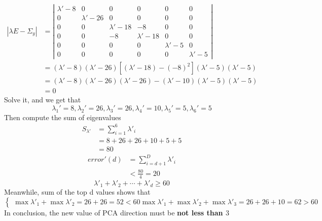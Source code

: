 \documentclass[12pt, letterpaper]{article}
\begin{document}
\begin{equation}
\begin{align}
	|\lambda E-\Sigma_y|
	&= \left|\begin{array}{cccccc}
		\lambda'-8 & 0 & 0 & 0 & 0 & 0\\
		0 & \lambda'-26 & 0 & 0 & 0 & 0\\
		0 & 0 & \lambda'-18 & -8 & 0 & 0\\
		0 & 0 & -8 & \lambda'-18 & 0 & 0\\
		0 & 0 & 0 & 0 & \lambda'-5 & 0\\
		0 & 0 & 0 & 0 & 0 & \lambda'-5
	\end{array}\right|\\
	&= (\lambda'-8)(\lambda'-26)[(\lambda'-18)-(-8)^2](\lambda'-5)(\lambda'-5)\\
	&= (\lambda'-8)(\lambda'-26)(\lambda'-26)-(\lambda'-10)(\lambda'-5)(\lambda'-5)\\
	&= 0
\end{align}
\end{equation}
Solve it, and we get that
\begin{equation}
	\lambda_1'=8,
	\lambda_2'=26,
	\lambda_3'=26,
	\lambda_4'=10,
	\lambda_5'=5,
	\lambda_6'=5
\end{equation}
Then compute the sum of eigenvalues
\begin{equation}
\begin{align}
	S_{\lambda'}
	&= \sum^6_{i=1}\lambda'_i\\
	&= 8+26+26+10+5+5\\
	&= 80
\end{align}
\end{equation}
\begin{equation}
\begin{align}
	error'(d)
	&= \sum^D_{i=d+1}\lambda'_i\\
	&< \frac{80}4=20
\end{align}
\end{equation}
\begin{equation}
	\lambda'_1+\lambda'_2+\cdots+\lambda'_d\geq 60
\end{equation}
Meanwhile, sum of the top d values shows that
\begin{equation}
\begin{cases}
	\max\lambda'_1+\max\lambda'_2=26+26=52<60
	\max\lambda'_1+\max\lambda'_2+\max\lambda'_3=26+26+10=62>60
\end{cases}
\end{equation}
In conclusion, the new value of PCA direction must be \textbf{not less than $3$}
\end{document}
